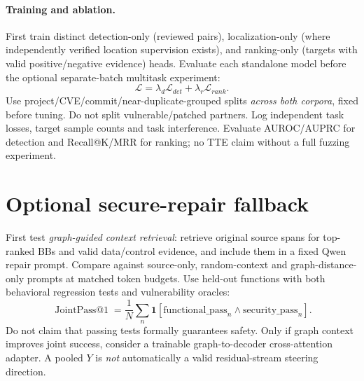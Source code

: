 \documentclass[10pt,a4paper]{article}
\begin{document}
\paragraph{Training and ablation.}
First train distinct detection-only (reviewed pairs), localization-only (where independently verified location supervision exists), and ranking-only (targets with valid positive/negative evidence) heads. Evaluate each standalone model before the optional separate-batch multitask experiment:
\[
 \mathcal L=\lambda_d\mathcal L_{det}+\lambda_r\mathcal L_{rank}.
\]
Use project/CVE/commit/near-duplicate-grouped splits \emph{across both corpora}, fixed before tuning. Do not split vulnerable/patched partners. Log independent task losses, target sample counts and task interference. Evaluate AUROC/AUPRC for detection and Recall@K/MRR for ranking; no TTE claim without a full fuzzing experiment.

\section{Optional secure-repair fallback}
First test \emph{graph-guided context retrieval}: retrieve original source spans for top-ranked BBs and valid data/control evidence, and include them in a fixed Qwen repair prompt. Compare against source-only, random-context and graph-distance-only prompts at matched token budgets. Use held-out functions with both behavioral regression tests and vulnerability oracles:
\[
 \operatorname{JointPass@1}=\frac1N\sum_n
 \mathbf1[\mathrm{functional\_pass}_n\land\mathrm{security\_pass}_n].
\]
Do not claim that passing tests formally guarantees safety. Only if graph context improves joint success, consider a trainable graph-to-decoder cross-attention adapter. A pooled $Y$ is \emph{not} automatically a valid residual-stream steering direction.
\end{document}
